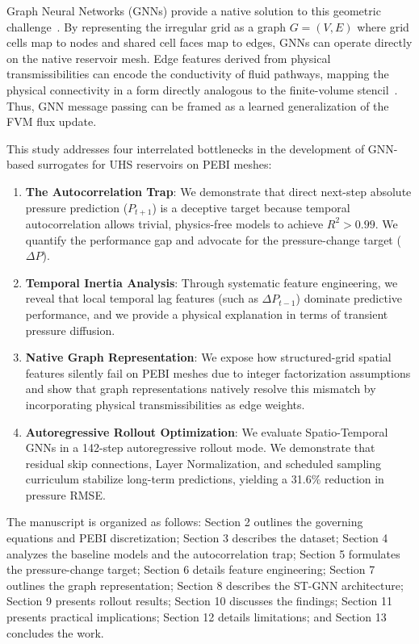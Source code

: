 Graph Neural Networks (GNNs) provide a native solution to this geometric challenge~\cite{geometric}. By representing the irregular grid as a graph $G = (V, E)$ where grid cells map to nodes and shared cell faces map to edges, GNNs can operate directly on the native reservoir mesh. Edge features derived from physical transmissibilities can encode the conductivity of fluid pathways, mapping the physical connectivity in a form directly analogous to the finite-volume stencil~\cite{pal2006tensor}. Thus, GNN message passing can be framed as a learned generalization of the FVM flux update.

This study addresses four interrelated bottlenecks in the development of GNN-based surrogates for UHS reservoirs on PEBI meshes:
\begin{enumerate}
    \item \textbf{The Autocorrelation Trap}: We demonstrate that direct next-step absolute pressure prediction ($P_{t+1}$) is a deceptive target because temporal autocorrelation allows trivial, physics-free models to achieve $R^2 > 0.99$. We quantify the performance gap and advocate for the pressure-change target ($\Delta P$).
    \item \textbf{Temporal Inertia Analysis}: Through systematic feature engineering, we reveal that local temporal lag features (such as $\Delta P_{t-1}$) dominate predictive performance, and we provide a physical explanation in terms of transient pressure diffusion.
    \item \textbf{Native Graph Representation}: We expose how structured-grid spatial features silently fail on PEBI meshes due to integer factorization assumptions and show that graph representations natively resolve this mismatch by incorporating physical transmissibilities as edge weights.
    \item \textbf{Autoregressive Rollout Optimization}: We evaluate Spatio-Temporal GNNs in a 142-step autoregressive rollout mode. We demonstrate that residual skip connections, Layer Normalization, and scheduled sampling curriculum stabilize long-term predictions, yielding a 31.6\% reduction in pressure RMSE.
\end{enumerate}
The manuscript is organized as follows: Section 2 outlines the governing equations and PEBI discretization; Section 3 describes the dataset; Section 4 analyzes the baseline models and the autocorrelation trap; Section 5 formulates the pressure-change target; Section 6 details feature engineering; Section 7 outlines the graph representation; Section 8 describes the ST-GNN architecture; Section 9 presents rollout results; Section 10 discusses the findings; Section 11 presents practical implications; Section 12 details limitations; and Section 13 concludes the work.
